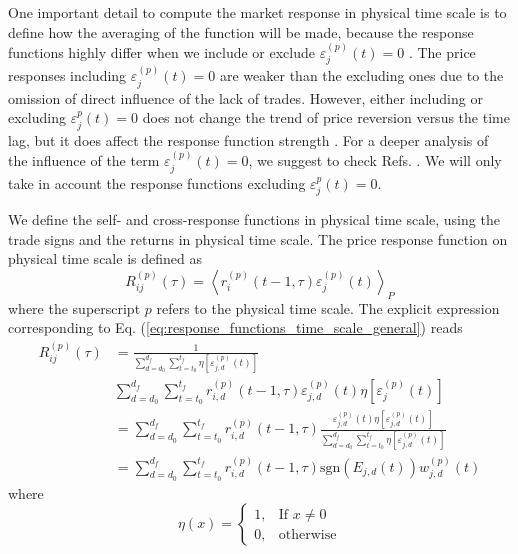 One important detail to compute the market response in physical time scale is
to define how the averaging of the function will be made, because the
response functions highly differ when we include or exclude
$\varepsilon^{\left(p\right)}_j \left( t\right) = 0$ \cite{Wang_2016_cross}.
The price responses including
$\varepsilon^{\left(p\right)}_j \left( t\right) = 0$ are weaker than the
excluding ones due to the omission of direct influence of the lack of trades.
However, either including or excluding $\varepsilon^{p}_j \left( t\right) = 0$
does not change the trend of price reversion versus the time lag, but it does
affect the response function strength \cite{Wang_2016_avg}. For a deeper
analysis of the influence of the term
$\varepsilon^{\left(p\right)}_j \left( t\right) = 0$, we suggest to check Refs.
\cite{Wang_2016_avg,Wang_2016_cross}. We will only take in account the
response functions excluding $\varepsilon^{p}_j \left( t\right) = 0$.

We define the self- and cross-response functions in physical time scale, using
the trade signs and the returns in physical time scale. The price response
function on physical time scale is defined as
\begin{equation}\label{eq:response_functions_time_scale_general}
    R^{\left(p\right)}_{ij}\left(\tau\right)=\left\langle r^{\left(p\right)}
    _{i}\left(t-1, \tau\right) \varepsilon_{j}^{\left(p\right)} \left(t\right)
    \right\rangle _{P}
\end{equation}
where the superscript $p$ refers to the physical time scale. The explicit
expression corresponding to Eq.
(\ref{eq:response_functions_time_scale_general}) reads
\begin{align}\label{eq:response_seconds_explicit}
    R_{ij}^{\left(p\right)}\left(\tau\right)&=\frac{1}{\sum_{d=d_{0}}^{d_{f}}
    \sum_{t=t_{0}}^{t_{f}} \eta\left[ \varepsilon_{j,d}^{\left(p\right)}
    \left(t\right)\right]} \nonumber \\
    &\sum_{d=d_{0}}^{d_{f}} \sum_{t=t_{0}}^{t_{f}}
    r^{\left(p\right)}_{i,d}\left(t-1,\tau\right)
    \varepsilon_{j,d}^{\left(p\right)}\left(t\right)
    \eta\left[\varepsilon_{j}^{\left(p\right)} \left(t\right)\right] \\
    &=\sum_{d=d_{0}}^{d_{f}}\sum_{t=t_{0}}^{t_{f}}r^{\left(p\right)}_{i,d}
    \left(t-1,\tau\right) \frac{\varepsilon_{j,d}^{\left(p\right)}
    \left(t\right) \eta\left[\varepsilon_{j,d}^{\left(p\right)}
    \left( t\right)\right]} {\sum_{d=d_{0}}^{d_{f}}\sum_{t=t_{0}}^{t_{f}}\eta
    \left[\varepsilon_{j,d}^{\left(p\right)} \left(t\right)\right]} \nonumber\\
    &=\sum_{d=d_{0}}^{d_{f}}\sum_{t=t_{0}}^{t_{f}}r^{\left(p\right)}_{i,d}
    \left(t-1,\tau\right) \text{sgn}\left(E_{j,d}\left(t\right)\right)
    w_{j,d}^{\left(p\right)}\left(t\right)
\end{align}
where
\begin{equation}
    \eta\left(x\right)=\left\{ \begin{array}{cc}
    1, & \text{If }x\ne0 \\
    0, & \text{otherwise}
    \end{array}\right.
\end{equation}

